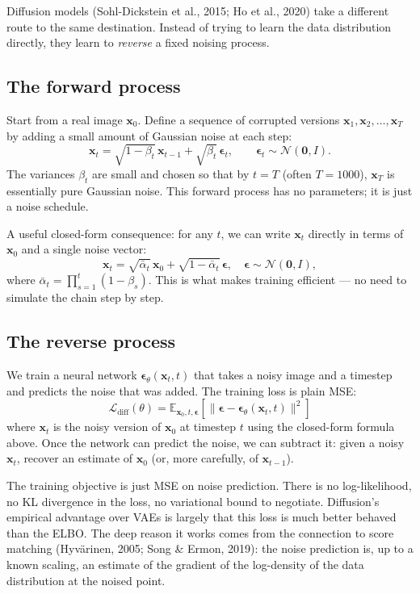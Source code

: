 Diffusion models (Sohl-Dickstein et al., 2015; Ho et al., 2020) take a different route to the same destination. Instead of trying to learn the data distribution directly, they learn to \emph{reverse} a fixed noising process.

\subsection{The forward process}

Start from a real image $\bm{x}_0$. Define a sequence of corrupted versions $\bm{x}_1, \bm{x}_2, \ldots, \bm{x}_T$ by adding a small amount of Gaussian noise at each step:
\[
\bm{x}_t = \sqrt{1 - \beta_t} \, \bm{x}_{t-1} + \sqrt{\beta_t} \, \bm{\epsilon}_t, \qquad \bm{\epsilon}_t \sim \mathcal{N}(\bm{0}, I).
\]
The variances $\beta_t$ are small and chosen so that by $t = T$ (often $T = 1000$), $\bm{x}_T$ is essentially pure Gaussian noise. This forward process has no parameters; it is just a noise schedule.

A useful closed-form consequence: for any $t$, we can write $\bm{x}_t$ directly in terms of $\bm{x}_0$ and a single noise vector:
\[
\bm{x}_t = \sqrt{\bar{\alpha}_t} \, \bm{x}_0 + \sqrt{1 - \bar{\alpha}_t} \, \bm{\epsilon}, \quad \bm{\epsilon} \sim \mathcal{N}(\bm{0}, I),
\]
where $\bar{\alpha}_t = \prod_{s=1}^t (1 - \beta_s)$. This is what makes training efficient --- no need to simulate the chain step by step.

\subsection{The reverse process}

We train a neural network $\bm{\epsilon}_\theta(\bm{x}_t, t)$ that takes a noisy image and a timestep and predicts the noise that was added. The training loss is plain MSE:
\[
\mathcal{L}_{\text{diff}}(\theta) = \mathbb{E}_{\bm{x}_0, t, \bm{\epsilon}} \!\left[ \|\bm{\epsilon} - \bm{\epsilon}_\theta(\bm{x}_t, t)\|^2 \right]
\]
where $\bm{x}_t$ is the noisy version of $\bm{x}_0$ at timestep $t$ using the closed-form formula above. Once the network can predict the noise, we can subtract it: given a noisy $\bm{x}_t$, recover an estimate of $\bm{x}_0$ (or, more carefully, of $\bm{x}_{t-1}$).

\begin{aitip}
The training objective is just MSE on noise prediction. There is no log-likelihood, no KL divergence in the loss, no variational bound to negotiate. Diffusion's empirical advantage over VAEs is largely that this loss is much better behaved than the ELBO. The deep reason it works comes from the connection to score matching (Hyvärinen, 2005; Song \& Ermon, 2019): the noise prediction is, up to a known scaling, an estimate of the gradient of the log-density of the data distribution at the noised point.
\end{aitip}

